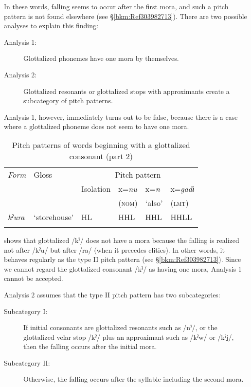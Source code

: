 In these words, falling seems to occur after the first mora, and such a pitch pattern is not found elsewhere (see §\ref{bkm:Ref303982713}). There are two possible analyses to explain this finding:

\begin{description}
\item[Analysis 1:] Glottalized phonemes have one mora by themselves.
\item[Analysis 2:] Glottalized resonants or glottalized stops with approximants create a subcategory of pitch patterns.
\end{description}

Analysis 1, however, immediately turns out to be false, because there is a case where a glottalized phoneme does not seem to have one mora.

\begin{table}
\caption{Pitch patterns of words beginning with a glottalized consonant (part 2)\label{tab:key:22}}
\begin{tabular}{>{\itshape}llllll}
\lsptoprule
\normalfont Form & Gloss & \multicolumn{4}{c}{Pitch pattern}\\\cmidrule(lr){3-6}
     &       & Isolation & x=\textit{nu} & x=\textit{n} & x=\textit{gadɨ}\\
     &       &           & (\textsc{nom}) & ‘also’ & (\textsc{lmt})\\\midrule
kˀura &  ‘storehouse’ &  HL &  HHL &  HHL &  HHLL\\
\lspbottomrule
\end{tabular}
\end{table}

 shows that glottalized /kˀ/ does not have a mora because the falling is realized not after /kˀu/ but after /ra/ (when it precedes clitics). In other words, it behaves regularly as the type II pitch pattern (see §\ref{bkm:Ref303982713}). Since we cannot regard the glottalized consonant /kˀ/ as having one mora, Analysis 1 cannot be accepted.

Analysis 2 assumes that the type II pitch pattern has two subcategories:

\begin{description}
\item[Subcategory I:] If initial consonants are glottalized resonants such as /nˀ/, or the glottalized velar stop /kˀ/ plus an approximant such as /kˀw/ or /kˀj/, then the falling occurs after the initial mora.
\item[Subcategory II:] Otherwise, the falling occurs after the syllable including the second mora.
\end{description}

